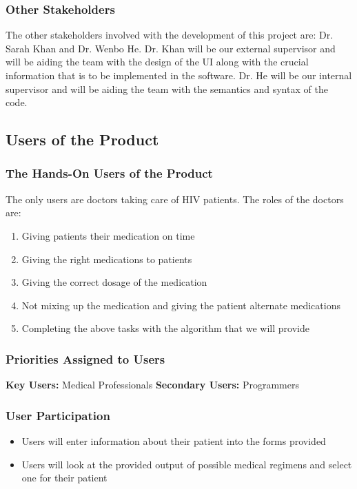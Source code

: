 \documentclass[12pt]{article}
\begin{document}
\subsubsection{Other Stakeholders}
The other stakeholders involved with the development of this project are: Dr. Sarah Khan and Dr. Wenbo He. Dr. Khan will be our external supervisor and will be aiding the team with the design of the UI along with the crucial information that is to be implemented in the software. Dr. He will be our internal supervisor and will be aiding the team with the semantics and syntax of the code.

\subsection{Users of the Product}

\subsubsection{The Hands-On Users of the Product}
The only users are doctors taking care of HIV patients. The roles of the doctors are:
\begin{enumerate}
\item Giving patients their medication on time
\item Giving the right medications to patients
\item Giving the correct dosage of the medication
\item Not mixing up the medication and giving the patient alternate medications
\item Completing the above tasks with the algorithm that we will provide
\end{enumerate}

\subsubsection{Priorities Assigned to Users}
{\bf Key Users:} Medical Professionals \newline
{\bf Secondary Users:} Programmers

\subsubsection{User Participation}
\begin{itemize}
\item Users will enter information about their patient into the forms provided
\item Users will look at the provided output of possible medical regimens and select one for their patient
\end{itemize}
\end{document}
